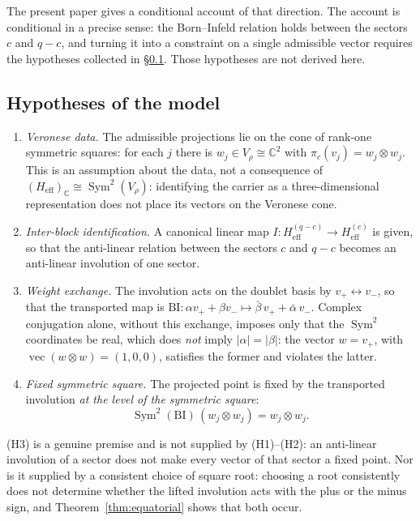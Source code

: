 \documentclass[11pt,a4paper]{article}
\DeclareMathOperator{\Sym}{Sym}
\newcommand{\Heff}{H_{\mathrm{eff}}}
\newcommand{\BI}{\mathrm{BI}}
\begin{document}
    The present paper gives a conditional account of that direction.
    The account is conditional in a precise sense: the Born--Infeld relation holds between the
    sectors $c$ and $q-c$, and turning it into a constraint on a single admissible vector requires
    the hypotheses collected in \S\ref{ssec:hyp}.
    Those hypotheses are not derived here.

  \subsection{Hypotheses of the model}
    \label{ssec:hyp}

    \begin{enumerate}
      \item[(H0)] \emph{Veronese data.} The admissible projections lie on the cone of rank-one
      symmetric squares: for each $j$ there is $w_j \in V_\rho \cong \mathbb{C}^2$ with
      $\pi_c(v_j) = w_j \otimes w_j$.
      This is an assumption about the data, not a consequence of $(\Heff)_{\mathbb{C}} \cong
      \Sym^2(V_\rho)$: identifying the carrier as a three-dimensional representation does not place
      its vectors on the Veronese cone.
      \item[(H1)] \emph{Inter-block identification.} A canonical linear map
      $I \colon \Heff^{(q-c)} \to \Heff^{(c)}$ is given, so that the anti-linear relation between
      the sectors $c$ and $q-c$ becomes an anti-linear involution of one sector.
      \item[(H2)] \emph{Weight exchange.} The involution acts on the doublet basis by
      $v_+ \leftrightarrow v_-$, so that the transported map is
      $\BI \colon \alpha v_+ + \beta v_- \mapsto \bar\beta\, v_+ + \bar\alpha\, v_-$.
      Complex conjugation alone, without this exchange, imposes only that the $\Sym^2$ coordinates
      be real, which does \emph{not} imply $|\alpha| = |\beta|$: the vector $w = v_+$, with
      $\operatorname{vec}(w \otimes w) = (1,0,0)$, satisfies the former and violates the latter.
      \item[(H3)] \emph{Fixed symmetric square.} The projected point is fixed by the transported
      involution \emph{at the level of the symmetric square}:
      \[
        \Sym^2(\BI)\,(w_j \otimes w_j) = w_j \otimes w_j .
      \]
    \end{enumerate}

    (H3) is a genuine premise and is not supplied by (H1)--(H2): an anti-linear involution of a
    sector does not make every vector of that sector a fixed point.
    Nor is it supplied by a consistent choice of square root: choosing a root consistently does not
    determine whether the lifted involution acts with the plus or the minus sign, and
    Theorem~\ref{thm:equatorial} shows that both occur.
\end{document}
